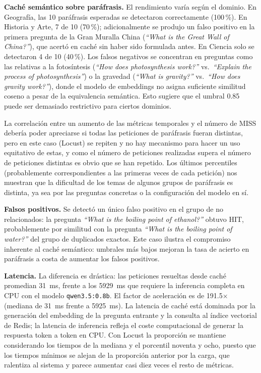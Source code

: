 \textbf{Caché semántico sobre paráfrasis.} El rendimiento varía según el dominio. En Geografía, las 10 paráfrasis esperadas se detectaron correctamente (100\,\%). En Historia y Arte, 7 de 10 (70\,\%); adicionalmente se produjo un falso positivo en la primera pregunta de la Gran Muralla China (\textit{``What is the Great Wall of China?''}), que acertó en caché sin haber sido formulada antes. En Ciencia solo se detectaron 4 de 10 (40\,\%). Los falsos negativos se concentran en preguntas como las relativas a la fotosíntesis (\textit{``How does photosynthesis work?''} vs.~\textit{``Explain the process of photosynthesis''}) o la gravedad (\textit{``What is gravity?''} vs.~\textit{``How does gravity work?''}), donde el modelo de embeddings no asigna suficiente similitud coseno a pesar de la equivalencia semántica. Esto sugiere que el umbral 0.85 puede ser demasiado restrictivo para ciertos dominios.

La correlación entre un aumento de las métricas temporales y el número de MISS debería poder apreciarse si todas las peticiones de paráfrasis fueran distintas, pero en este caso (Locust) se repiten y no hay mecanismo para hacer un uso equitativo de estas, y como el número de peticiones realizadas supera el número de peticiones distintas es obvio que se han repetido. Los últimos percentiles (probablemente correspondientes a las primeras veces de cada petición) nos muestran que la dificultad de los temas de algunos grupos de paráfrasis es distinta, ya sea por las preguntas concretas o la configuración del modelo en sí.

\textbf{Falsos positivos.} Se detectó un único falso positivo en el grupo de no relacionados: la pregunta \textit{``What is the boiling point of ethanol?''} obtuvo HIT, probablemente por similitud con la pregunta \textit{``What is the boiling point of water?''} del grupo de duplicados exactos. Este caso ilustra el compromiso inherente al caché semántico: umbrales más bajos mejoran la tasa de acierto en paráfrasis a costa de aumentar los falsos positivos.

\textbf{Latencia.} La diferencia es drástica: las peticiones resueltas desde caché promedian 31~ms, frente a los 5929~ms que requiere la inferencia completa en CPU con el modelo \texttt{qwen3.5:0.8b}. El factor de aceleración es de 191.5$\times$ (mediana de 31~ms frente a 5925~ms). La latencia de caché está dominada por la generación del embedding de la pregunta entrante y la consulta al índice vectorial de Redis; la latencia de inferencia refleja el coste computacional de generar la respuesta token a token en CPU. Con Locust la proporción se mantiene considerando los tiempos de la mediana y el porcentil noventa y ocho, puesto que los tiempos mínimos se alejan de la proporción anterior por la carga, que ralentiza al sistema y parece aumentar casi diez veces el resto de métricas.


